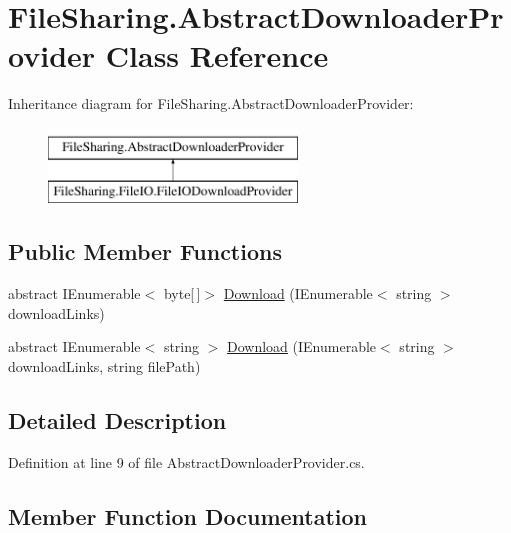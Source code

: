 \hypertarget{class_file_sharing_1_1_abstract_downloader_provider}{}\section{File\+Sharing.\+Abstract\+Downloader\+Provider Class Reference}
\label{class_file_sharing_1_1_abstract_downloader_provider}
Inheritance diagram for File\+Sharing.\+Abstract\+Downloader\+Provider\+:\begin{figure}[H]
\begin{center}
\leavevmode
\includegraphics[height=2.000000cm]{class_file_sharing_1_1_abstract_downloader_provider}
\end{center}
\end{figure}
\subsection*{Public Member Functions}
\begin{DoxyCompactItemize}
\item 
abstract I\+Enumerable$<$ byte\mbox{[}$\,$\mbox{]}$>$ \hyperlink{class_file_sharing_1_1_abstract_downloader_provider_a38b11b25b2acda450d8406ca488585dd}{Download} (I\+Enumerable$<$ string $>$ download\+Links)
\item 
abstract I\+Enumerable$<$ string $>$ \hyperlink{class_file_sharing_1_1_abstract_downloader_provider_ada4a19b16867bad02c79f09072f69b84}{Download} (I\+Enumerable$<$ string $>$ download\+Links, string file\+Path)
\end{DoxyCompactItemize}


\subsection{Detailed Description}


Definition at line 9 of file Abstract\+Downloader\+Provider.\+cs.



\subsection{Member Function Documentation}
\mbox{\label{class_file_sharing_1_1_abstract_downloader_provider_a38b11b25b2acda450d8406ca488585dd}} 
